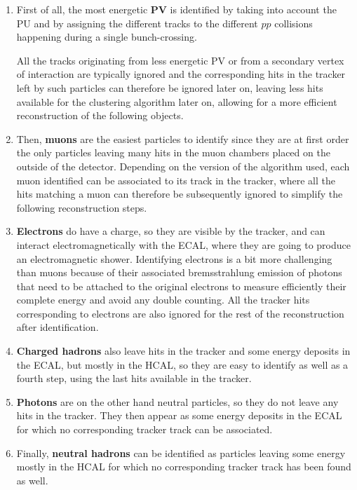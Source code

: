 \documentclass[a4paper, 10pt, openright]{report}
\begin{document}
\begin{enumerate}
\item First of all, the most energetic \textbf{\acf{PV}} is identified by taking into account the \ac{PU} and by assigning the different tracks to the different $pp$ collisions happening during a single bunch-crossing. 

All the tracks originating from less energetic \ac{PV} or from a secondary vertex of interaction are typically ignored and the corresponding hits in the tracker left by such particles can therefore be ignored later on, leaving less hits available for the clustering algorithm later on, allowing for a more efficient reconstruction of the following objects.
\item Then, \textbf{muons} are the easiest particles to identify since they are at first order the only particles leaving many hits in the muon chambers placed on the outside of the detector. Depending on the version of the algorithm used, each muon identified can be associated to its track in the tracker, where all the hits matching a muon can therefore be subsequently ignored to simplify the following reconstruction steps.
\item \textbf{Electrons} do have a charge, so they are visible by the tracker, and can interact electromagnetically with the \ac{ECAL}, where they are going to produce an electromagnetic shower. Identifying electrons is a bit more challenging than muons because of their associated bremsstrahlung emission of photons that need to be attached to the original electrons to measure efficiently their complete energy and avoid any double counting. All the tracker hits corresponding to electrons are also ignored for the rest of the reconstruction after identification.
\item \textbf{Charged hadrons} also leave hits in the tracker and some energy deposits in the \ac{ECAL}, but mostly in the \ac{HCAL}, so they are easy to identify as well as a fourth step, using the last hits available in the tracker.
\item \textbf{Photons} are on the other hand neutral particles, so they do not leave any hits in the tracker. They then appear as some energy deposits in the \ac{ECAL} for which no corresponding tracker track can be associated.
\item Finally, \textbf{neutral hadrons} can be identified as particles leaving some energy mostly in the \ac{HCAL} for which no corresponding tracker track has been found as well.
\end{enumerate}
\end{document}
